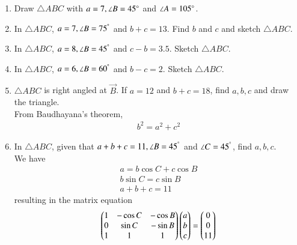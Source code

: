 \documentclass[journal,12pt,twocolumn]{IEEEtran}
\renewcommand\thesection{\arabic{section}}
\begin{document}
\begin{enumerate}[label=\thesection.\arabic*
,ref=\thesection.\theenumi]
\item Draw $\triangle ABC$ with $a = 7, \angle B = 45\degree$ and $\angle A = 105 \degree$. 
\item In $\triangle ABC$,  $a = 7, \angle B = 75^{\degree}$ and $b+c = 13$. 
Find $b$ and $c$ and sketch $\triangle ABC$.
\item In $\triangle ABC$,  $a = 8, \angle B = 45^{\degree}$ and $c-b = 3.5$.
Sketch $\triangle ABC$.
\item In $\triangle ABC$,  $a = 6, \angle B = 60^{\degree}$ and $b-c = 2$. 
Sketch $\triangle ABC$.
\item $\triangle ABC$ is right angled at $\vec{B}$.  If $a = 12$ and $b+c = 18$, find $a,b,c$ and draw the triangle.
\\
\solution From Baudhayana's theorem, 
\begin{align}
b^2 = a^2 + c^2
\end{align}
%
\item In $\triangle ABC$,  given that $a+b+c = 11, \angle B = 45^{\degree}$ and $\angle C = 45^{\degree}$, 
find 
$a,b,c$.
\\
\solution We have
\begin{align}
a = b \cos C + c \cos B
\\
b \sin C = c \sin B
\\
a + b+c = 11
\end{align}
%
resulting  in the matrix equation 
\begin{align}
\begin{pmatrix}
1 & -\cos C & - \cos B
\\
0 & \sin C &- \sin B
\\
1 & 1 & 1
\end{pmatrix}
\begin{pmatrix}a \\b\\c\end{pmatrix} = \begin{pmatrix}0 \\ 0 \\ 11\end{pmatrix}
\end{align}


\end{enumerate}
\end{document}
